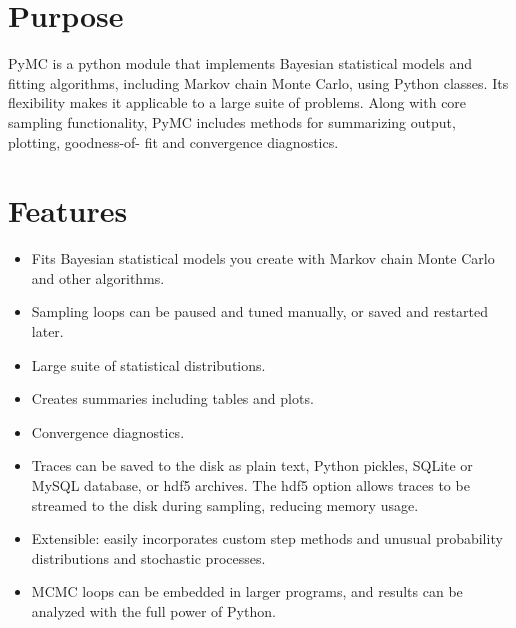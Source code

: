 





\hypertarget{purpose}{}
\section*{Purpose}

PyMC is a python module that implements Bayesian statistical models and
fitting algorithms, including Markov chain Monte Carlo, using Python classes. 
Its flexibility makes it applicable to a large suite of problems. Along with 
core sampling functionality, PyMC includes methods for summarizing output, plotting, 
goodness-of- fit and convergence diagnostics.



\hypertarget{features}{}
\section*{Features}
\begin{itemize}
\item {} 
Fits Bayesian statistical models you create with Markov chain Monte Carlo and 
other algorithms.

\item {} 
Sampling loops can be paused and tuned manually, or saved and restarted later.

\item {} 
Large suite of statistical distributions.

\item {} 
Creates summaries including tables and plots.

\item {} 
Convergence diagnostics.

\item {} 
Traces can be saved to the disk as plain text, Python pickles, SQLite or MySQL
database, or hdf5 archives. The hdf5 option allows traces to be streamed
to the disk during sampling, reducing memory usage.

\item {} 
Extensible: easily incorporates custom step methods and unusual probability 
distributions and stochastic processes.

\item {} 
MCMC loops can be embedded in larger programs, and results can be analyzed 
with the full power of Python.

\end{itemize}


